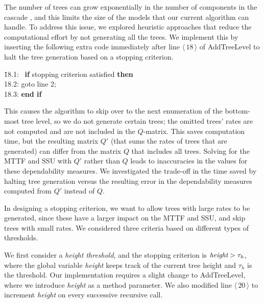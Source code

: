 \documentclass[12pt]{article}
\newcommand{\varName}[1]{\textrm{\it#1}}
\newcommand{\citeLine}[1]{$\langle \, #1 \, \rangle$}
\begin{document}
The number of trees can grow exponentially in the number of components in the
cascade \cite{ING:2009}, and this limits the size of the models that our
current algorithm can handle.  To address this issue, we explored heuristic approaches
that reduce the computational effort by 
not generating all the trees.
We implement this by
inserting the following
extra code 
immediately after
line \citeLine{18} of
\mbox{AddTreeLevel}
to 
halt the tree generation based
on a stopping criterion. 
\begin{tabbing}
\hspace*{1em} \=
{\small 18.1:} \ \=
\textbf{if} stopping criterion satisfied
\textbf{then}
\\
\> 
{\small 18.2:}
\> \hspace*{0.5em}
goto line 2;
\\
\>
{\small 18.3:}
\> \textbf{end if}
\end{tabbing}
%
This causes the algorithm to
skip over to the next enumeration of the
bottom-most tree level,
so 
we do not generate certain trees;
the omitted trees' rates are not
computed and are not included in the 
$Q$-matrix.
This saves computation time,
but the resulting matrix $Q'$ (that
sums the rates of trees that are generated) 
can differ from the
matrix $Q$ that 
includes all trees. Solving for the MTTF and
SSU with $Q'$ rather than $Q$ leads to inaccuracies in the values for these
dependability measures.  We investigated the trade-off in the time saved by
halting tree generation versus the resulting error in the dependability
measures computed from $Q'$ instead of $Q$.

In designing a stopping criterion,
we want to allow trees with large rates 
to be generated,
since these have a larger impact on
the MTTF and SSU, and skip trees
with small rates.
We considered three
criteria based on different 
types of thresholds.


We first consider a \textit{height threshold}, 
and the stopping criterion is 
$\varName{height} > \tau_h$,
where the global variable \varName{height} 
keeps track of the current tree height
and $\tau_h$ is the threshold.  
Our implementation requires a 
slight change to \mbox{AddTreeLevel}, 
where we introduce \varName{height} 
as a method parameter. We also modified line
\citeLine{20} to increment \varName{height} 
on every successive recursive call.
\end{document}
